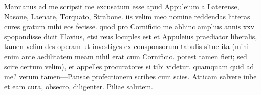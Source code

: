 


Marcianus ad me scripsit me excusatum esse apud Appuleium a
              Laterense, Nasone, Laenate, Torquato,
              Strabone. iis velim meo nomine reddendas litteras cures gratum
            mihi eos fecisse. quod pro Cornificio me abhinc amplius annis
            xxv spopondisse dicit Flavius, etsi reus locuples est et
              Appuleius praediator liberalis, tamen velim des operam ut investiges ex
            consponsorum tabulis sitne ita (mihi enim ante aedilitatem meam nihil erat cum
              Cornificio. potest tamen fieri; sed scire certum velim), et
            appelles procuratores si tibi videtur. quamquam quid ad me? verum tamen—Pansae profectionem scribes cum scies.
              Atticam salvere iube et eam cura, obsecro, diligenter.
              Piliae salutem.
